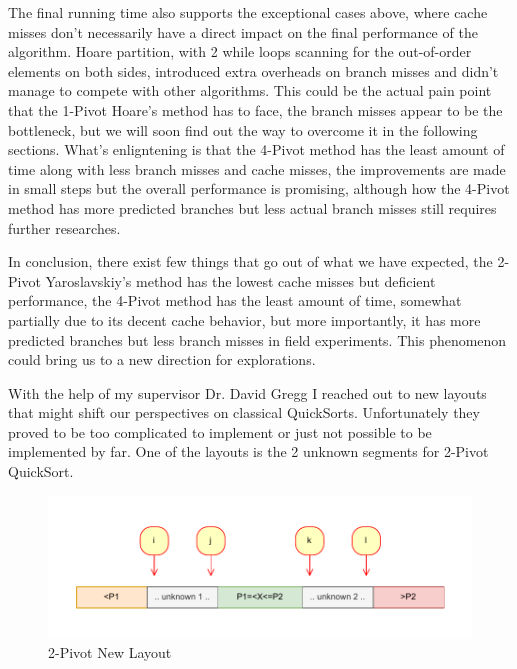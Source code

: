 \documentclass{article}
\begin{document}
The final running time also supports the exceptional cases above, where cache misses don't necessarily have a direct impact on the final performance of the algorithm.
Hoare partition, with 2 while loops scanning for the out-of-order elements on both sides, introduced extra overheads on branch misses and didn't manage to compete with other algorithms.
This could be the actual pain point that the 1-Pivot Hoare's method has to face, the branch misses appear to be the bottleneck, but we will soon find out the way to overcome it in the following sections.
What's enligntening is that the 4-Pivot method has the least amount of time along with less branch misses and cache misses, the improvements are made in small steps but the overall performance is promising,
although how the 4-Pivot method has more predicted branches but less actual branch misses still requires further researches.

In conclusion, there exist few things that go out of what we have expected, the 2-Pivot Yaroslavskiy's method has the lowest cache misses but deficient performance, the 4-Pivot method has the least amount of time,
somewhat partially due to its decent cache behavior, but more importantly, it has more predicted branches but less branch misses in field experiments. This phenomenon could bring us to a new direction for explorations.



With the help of my supervisor Dr. David Gregg I reached out to new layouts that might shift our perspectives on classical QuickSorts. Unfortunately they proved to be too complicated to implement or just not possible to be implemented by far.
One of the layouts is the 2 unknown segments for 2-Pivot QuickSort.

\begin{figure}[H]
    \hypertarget{fig:2pivotnewlayout}{}
    \caption{2-Pivot New Layout}
    \centering
    \hspace*{-0.27\textwidth}
    \includegraphics[width=1.5\textwidth]{2pivot_new_layout.drawio.pdf}
\end{figure}
\end{document}
